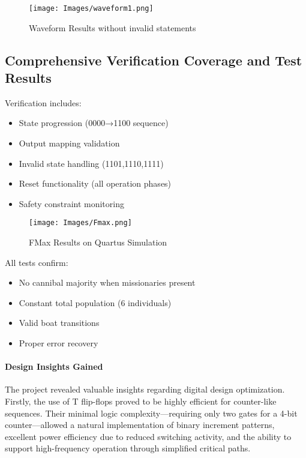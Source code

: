 \documentclass[10pt,a4paper]{article}
\begin{document}
\begin{figure}[h]
    \centering
    \texttt{[image: Images/waveform1.png]}
    \caption{Waveform Results without invalid statements}
    \label{fig:coverage}
\end{figure}


\subsection{Comprehensive Verification Coverage and Test Results}

Verification includes:

\begin{itemize}
    \item State progression (0000→1100 sequence)
    \item Output mapping validation
    \item Invalid state handling (1101,1110,1111)
    \item Reset functionality (all operation phases)
    \item Safety constraint monitoring
\end{itemize}

\begin{figure}[H]
    \centering
    \texttt{[image: Images/Fmax.png]}
    \caption{FMax Results on Quartus Simulation}
    \label{fig:coverage}
\end{figure}

All tests confirm:
\begin{itemize}
    \item No cannibal majority when missionaries present
    \item Constant total population (6 individuals)
    \item Valid boat transitions
    \item Proper error recovery
\end{itemize}


\paragraph{Design Insights Gained}  
The project revealed valuable insights regarding digital design optimization. Firstly, the use of T flip-flops proved to be highly efficient for counter-like sequences. Their minimal logic complexity—requiring only two gates for a 4-bit counter—allowed a natural implementation of binary increment patterns, excellent power efficiency due to reduced switching activity, and the ability to support high-frequency operation through simplified critical paths.
\end{document}
